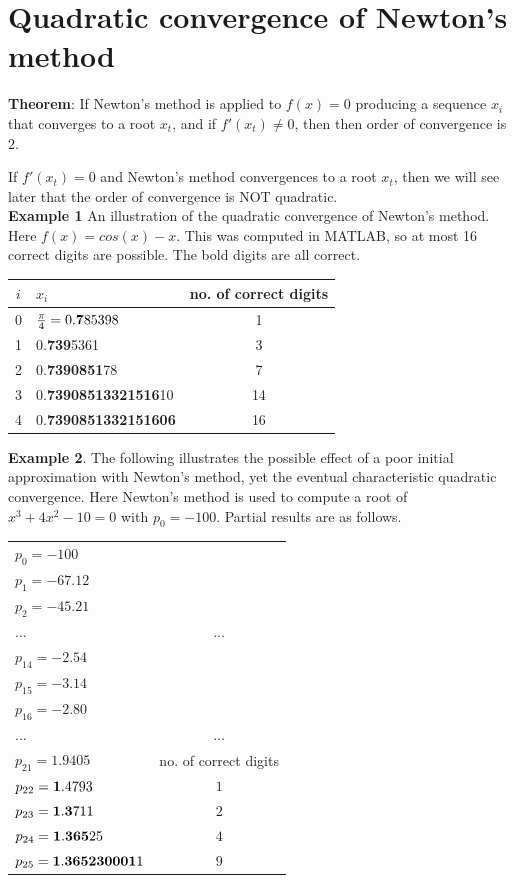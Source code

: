 \documentclass [titlepage,12pt,letter] {article}
\begin{document}
\section{Quadratic convergence of Newton's method} 

{\bf Theorem}: If Newton's method is applied to $f(x) = 0$ producing 
a sequence $x_i$ that converges to a root $x_t$, and if $f'(x_t) \neq 0$, then 
then order of convergence is $2$. 

If $f'(x_t) = 0$ and Newton's method convergences to a root $x_t$, then we will see later that the order of convergence is NOT quadratic. \\ 

\medskip 
\noindent 
{\bf Example 1} An illustration of the quadratic convergence of Newton's method. Here $f(x) = cos(x) -x$. This was computed in MATLAB, so at most 16 correct digits are possible. The bold digits are all correct. 


\begin{table}[h] 
\begin{tabular}{c|l|c}
$i$ & $x_i$ & no. of correct digits \\ 
\hline
0   & $\frac{\pi}{4} = 0.{\bf 7}85398$ & 1 \\ 
1   & 0.{\bf 739}5361 & 3 \\ 
2   & 0.{\bf 7390851}78 & 7 \\ 
3   & 0.{\bf 73908513321516}10 & 14 \\ 
4   & 0.{\bf 7390851332151606}  & 16 \\ 
\end{tabular} 
\end{table}  


\medskip 
\noindent 
{\bf Example 2}. The following illustrates the possible effect of a poor initial approximation with Newton's method, yet the eventual characteristic quadratic convergence. Here Newton's method is used to compute a root of $x^3 + 4 x^2 -10 = 0$ with $p_0 = -100$. Partial results are as follows. 

\begin{table}[h]
\begin{tabular}{l|c}
$p_0 = -100$ &  \\ 
$p_1 = -67.12$ &  \\ 
$p_2 = -45.21$ &  \\ 
$\dots$ & $\dots$ \\ 
$p_{14} = -2.54$ &  \\ 
$p_{15} = -3.14$ &  \\ 
$p_{16} = -2.80$ &  \\ 
$\dots$ & $\dots$ \\ 
$p_{21} = 1.9405$ &  no. of correct digits \\ 
$p_{22} = {\bf 1}.4793$ &  $1$ \\ 
$p_{23} = {\bf 1.3}711$ &  $2$ \\ 
$p_{24} = {\bf 1.365}25$ &  $4$ \\ 
$p_{25} = {\bf 1.365230001}1$  &  $9$ \\ 
\end{tabular} 
\end{table} 
\end{document}
